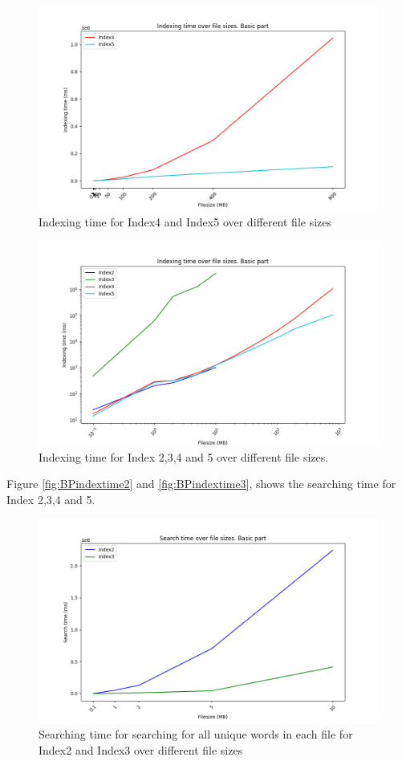 \begin{figure}[H]
    \centering
    \includegraphics[width=.7\textwidth]{LaTeX/Pictures/Results/BPIndexing[4, 5].png}
    \caption{Indexing time for Index4 and Index5 over different file sizes}
    \label{fig:BPindextime45}
\end{figure}

\begin{figure}[H]
    \centering
    \includegraphics[width=.7\textwidth]{LaTeX/Pictures/Results/BPIndexing[2, 3, 4, 5].png}
    \caption{Indexing time for Index 2,3,4 and 5 over different file sizes.}
    \label{fig:BPindextime2345}
\end{figure}

Figure \ref{fig:BPindextime2} and \ref{fig:BPindextime3}, shows the searching time for Index 2,3,4 and 5.

\begin{figure}[H]
    \centering
    \includegraphics[width=.7\textwidth]{LaTeX/Pictures/Results/BPSearch[2, 3].png}
    \caption{Searching time for searching for all unique words in each file for Index2 and Index3 over different file sizes}
    \label{fig:BPsearch23}
\end{figure}

